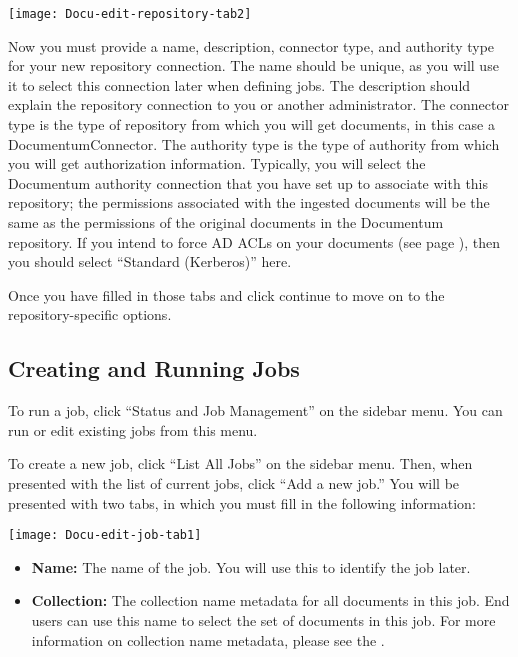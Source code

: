 \begin{changemargin}{1.5in}{0in}
\texttt{[image: Docu-edit-repository-tab2]}

Now you must provide a name, description, connector type, and
authority type for your new repository connection. The name should be
unique, as you will use it to select this connection later when
defining jobs. The description should explain the repository
connection to you or another administrator.  The connector type is the
type of repository from which you will get documents, in this case a
DocumentumConnector. The authority type is the type of authority from
which you will get authorization information. Typically, you will
select the Documentum authority connection that you have set up to
associate with this repository; the permissions associated with the
ingested documents will be the same as the permissions of the original
documents in the Documentum repository. If you intend to force AD ACLs
on your documents (see page \pageref{ForceACL}), then you should
select ``Standard (Kerberos)'' here.

Once you have filled in those tabs and click continue to move on to
the repository-specific options.



\subsection{Creating and Running Jobs}

To run a job, click ``Status and Job Management'' on the sidebar menu.
You can run or edit existing jobs from this menu.

To create a new job, click ``List All Jobs'' on the sidebar menu. Then, when
presented with the list of current jobs, click ``Add a new job.'' You
will be presented with two tabs, in which you must fill in the following
information:

\texttt{[image: Docu-edit-job-tab1]}

\begin{itemize}

\item \textbf{Name:} The name of the job. You will use this to identify
the job later.

\item \textbf{Collection:} The collection name metadata for all
documents in this job. End users can use this name to select the set
of documents in this job. For more information on collection name
metadata, please see the .


\end{itemize}
\end{changemargin}
